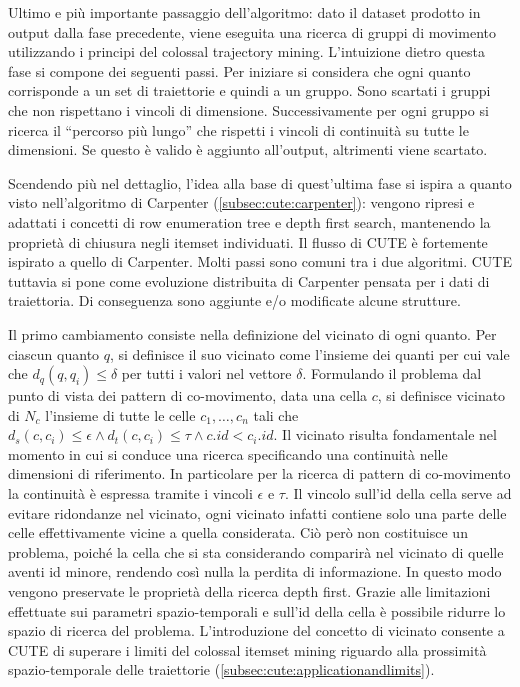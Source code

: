 Ultimo e più importante passaggio dell'algoritmo: dato il dataset prodotto in output dalla fase precedente,
viene eseguita una ricerca di gruppi di movimento utilizzando i principi del colossal trajectory mining.
L'intuizione dietro questa fase si compone dei seguenti passi.
Per iniziare si considera che ogni quanto corrisponde a un set di traiettorie e quindi a un gruppo.
Sono scartati i gruppi che non rispettano i vincoli di dimensione.
Successivamente per ogni gruppo si ricerca il ``percorso più lungo'' che rispetti i vincoli di continuità su tutte le dimensioni.
Se questo è valido è aggiunto all'output, altrimenti viene scartato.

Scendendo più nel dettaglio, l'idea alla base di quest'ultima fase si ispira a quanto visto nell'algoritmo di Carpenter (\cref{subsec:cute:carpenter}): 
vengono ripresi e adattati i concetti di row enumeration tree e depth first search, mantenendo la proprietà di 
chiusura negli itemset individuati.
Il flusso di CUTE è fortemente ispirato a quello di Carpenter.
Molti passi sono comuni tra i due algoritmi.
CUTE tuttavia si pone come evoluzione distribuita di Carpenter pensata per i dati di traiettoria.
Di conseguenza sono aggiunte e/o modificate alcune strutture.

Il primo cambiamento consiste nella definizione del vicinato di ogni quanto.
Per ciascun quanto \(q\), si definisce il suo vicinato come l'insieme dei quanti per cui vale che \(d_q(q, q_i) \leq \delta\) per tutti i valori nel vettore \(\delta\).
Formulando il problema dal punto di vista dei pattern di co-movimento, data una cella \(c\), si definisce vicinato di \(N_{c}\) l'insieme di tutte le celle \(c_{1},\ldots, c_{n}\) tali che \( d_{s}(c, c_{i}) \leq \epsilon \land d_{t}(c, c_{i}) \leq \tau \land c.id < c_{i}.id\).
Il vicinato risulta fondamentale nel momento in cui si conduce una ricerca specificando una continuità nelle dimensioni di riferimento.
In particolare per la ricerca di pattern di co-movimento la continuità è espressa tramite i vincoli \(\epsilon\) e \(\tau\).
Il vincolo sull'id della cella serve ad evitare ridondanze nel vicinato, ogni vicinato infatti contiene solo una parte delle celle effettivamente vicine a quella considerata.
Ciò però non costituisce un problema, poiché la cella che si sta considerando comparirà nel vicinato di quelle aventi id minore, rendendo così nulla la perdita di informazione.
In questo modo vengono preservate le proprietà della ricerca depth first.
Grazie alle limitazioni effettuate sui parametri spazio-temporali e sull'id della cella è possibile ridurre lo spazio di ricerca del problema.
L'introduzione del concetto di vicinato consente a CUTE di superare i limiti del colossal itemset mining riguardo alla prossimità spazio-temporale delle traiettorie (\cref{subsec:cute:applicationandlimits}).  

